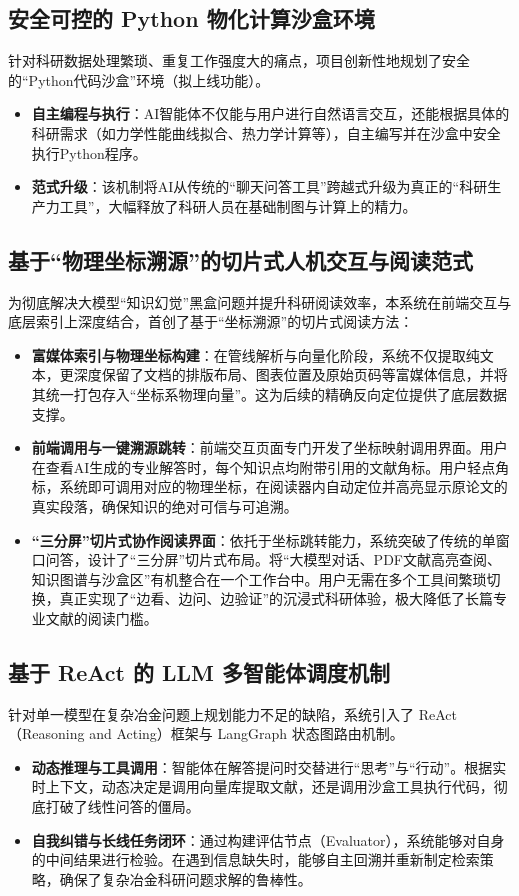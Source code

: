 \documentclass[a4paper, 12pt]{ctexart}
\begin{document}
\subsection{安全可控的 Python 物化计算沙盒环境}
针对科研数据处理繁琐、重复工作强度大的痛点，项目创新性地规划了安全的“Python代码沙盒”环境（拟上线功能）。
\begin{itemize}
    \item \textbf{自主编程与执行}：AI智能体不仅能与用户进行自然语言交互，还能根据具体的科研需求（如力学性能曲线拟合、热力学计算等），自主编写并在沙盒中安全执行Python程序。
    \item \textbf{范式升级}：该机制将AI从传统的“聊天问答工具”跨越式升级为真正的“科研生产力工具”，大幅释放了科研人员在基础制图与计算上的精力。
\end{itemize}

\subsection{基于“物理坐标溯源”的切片式人机交互与阅读范式}
为彻底解决大模型“知识幻觉”黑盒问题并提升科研阅读效率，本系统在前端交互与底层索引上深度结合，首创了基于“坐标溯源”的切片式阅读方法：
\begin{itemize}
    \item \textbf{富媒体索引与物理坐标构建}：在管线解析与向量化阶段，系统不仅提取纯文本，更深度保留了文档的排版布局、图表位置及原始页码等富媒体信息，并将其统一打包存入“坐标系物理向量”。这为后续的精确反向定位提供了底层数据支撑。
    \item \textbf{前端调用与一键溯源跳转}：前端交互页面专门开发了坐标映射调用界面。用户在查看AI生成的专业解答时，每个知识点均附带引用的文献角标。用户轻点角标，系统即可调用对应的物理坐标，在阅读器内自动定位并高亮显示原论文的真实段落，确保知识的绝对可信与可追溯。
    \item \textbf{“三分屏”切片式协作阅读界面}：依托于坐标跳转能力，系统突破了传统的单窗口问答，设计了“三分屏”切片式布局。将“大模型对话、PDF文献高亮查阅、知识图谱与沙盒区”有机整合在一个工作台中。用户无需在多个工具间繁琐切换，真正实现了“边看、边问、边验证”的沉浸式科研体验，极大降低了长篇专业文献的阅读门槛。
\end{itemize}
\subsection{基于 ReAct 的 LLM 多智能体调度机制}
针对单一模型在复杂冶金问题上规划能力不足的缺陷，系统引入了 ReAct（Reasoning and Acting）框架与 LangGraph 状态图路由机制。
\begin{itemize}
    \item \textbf{动态推理与工具调用}：智能体在解答提问时交替进行“思考”与“行动”。根据实时上下文，动态决定是调用向量库提取文献，还是调用沙盒工具执行代码，彻底打破了线性问答的僵局。
    \item \textbf{自我纠错与长线任务闭环}：通过构建评估节点（Evaluator），系统能够对自身的中间结果进行检验。在遇到信息缺失时，能够自主回溯并重新制定检索策略，确保了复杂冶金科研问题求解的鲁棒性。
\end{itemize}
\end{document}
